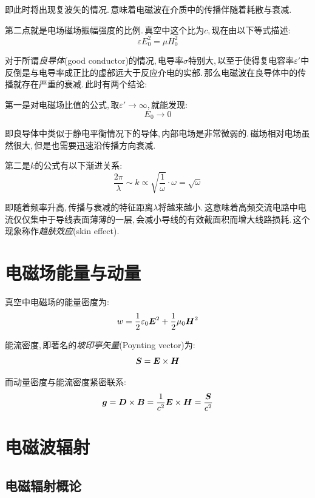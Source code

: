即此时将出现复波矢的情况.\,意味着电磁波在介质中的传播伴随着耗散与衰减.

第二点就是电场磁场振幅强度的比例.\,真空中这个比为$c$,\,现在由以下等式描述:
\[\varepsilon E_0^2=\mu H_0^2\]

对于所谓\emph{良导体}(good conductor)的情况,\,电导率$\sigma$特别大,\,以至于使得复电容率$\varepsilon'$中反倒是与电导率成正比的虚部远大于反应介电的实部.\,那么电磁波在良导体中的传播就存在严重的衰减.\,此时有两个结论:

第一是对电磁场比值的公式,\,取$\varepsilon'\to\infty$,\,就能发现:
\[E_0\to 0\]

即良导体中类似于静电平衡情况下的导体,\,内部电场是非常微弱的.\,磁场相对电场虽然很大,\,但是也需要迅速沿传播方向衰减.

第二是$k$的公式有以下渐进关系:
\[\frac{2\pi}{\lambda}\sim k\propto\sqrt{\frac{1}{\omega}}\cdot \omega=\sqrt{\omega}\]

即随着频率升高,\,传播与衰减的特征距离$\lambda$将越来越小.\,这意味着高频交流电路中电流仅仅集中于导线表面薄薄的一层,\,会减小导线的有效截面积而增大线路损耗.\,这个现象称作\emph{趋肤效应}(skin effect).



\section{电磁场能量与动量}

真空中电磁场的能量密度为:
\[w=\frac{1}{2}\varepsilon_0\boldsymbol{E}^2+\frac{1}{2}\mu_0\boldsymbol{H}^2\]

能流密度,\,即著名的\emph{坡印亭矢量}(Poynting vector)为:
\[\boldsymbol{S}=\boldsymbol{E}\times \boldsymbol{H}\]

而动量密度与能流密度紧密联系:
\[\boldsymbol{g}=\boldsymbol{D}\times \boldsymbol{B}=\frac{1}{c^2}\boldsymbol{E}\times \boldsymbol{H}=\frac{\boldsymbol{S}}{c^2}\]



\section{电磁波辐射}

\subsection{电磁辐射概论}

